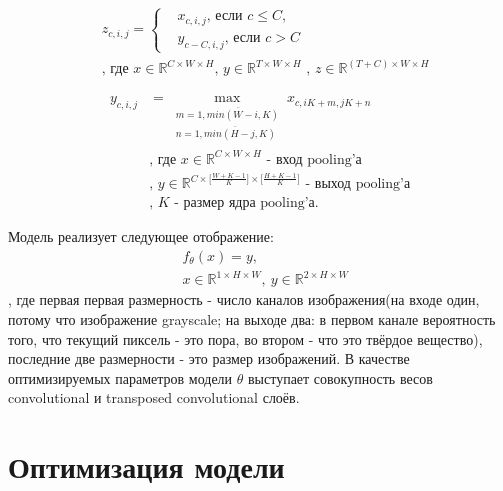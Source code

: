\documentclass[14pt, a4paper, oneside, bold]{extarticle}
\begin{document}
\begin{equation} \label{concat}
\begin{aligned}
	& z_{c, i, j} = \begin{cases}
		& x_{c, i, j} \text{, если $c \leq C$,} \\
		& y_{c - C, i, j} \text{, если $c > C$}
	\end{cases} \\
	& \text{, где $x \in \mathbb{R}^{C \times W \times H}$
	,\ $y \in \mathbb{R}^{T \times W \times H}$ 
	,\ $z \in \mathbb{R}^{(T + C) \times W \times H}$}
\end{aligned}
\end{equation}

\begin{equation} \label{pooling}
\begin{aligned}
	y_{c, i, j} & = \max \limits_{
		\substack{
			m=\overline{1, min(W - i, K)}
			\\ n=\overline{1, min(H - j, K)}}}
		x_{c, i K + m, j K + n} \\
	& \text{, где $x \in \mathbb{R}^{C \times W \times H}$ 
		- вход pooling'а} \\
	& \text{, $y \in \mathbb{R}
		^{C 
		  \times \bigl[ \frac{W + K - 1}{K} \bigr] 
		  \times \bigl[ \frac{H + K - 1}{K} \bigr] }$ 
		- выход pooling'а} \\
	& \text{, $K$ - размер ядра pooling'а}.
\end{aligned}
\end{equation}

Модель реализует следующее отображение: 
\begin{equation} \label{model}
\begin{aligned}
	& f_{\theta}(x) = y, \\
	& x \in \mathbb{R}^{1 \times H \times W}
		,\ y \in 
		\mathbb{R}^{2 \times H \times W}
\end{aligned}
\end{equation}
, где первая первая размерность - число каналов изображения(на входе один, потому что изображение grayscale; на выходе два: в первом канале вероятность того, что текущий пиксель - это пора, во втором - что это твёрдое вещество), последние две размерности - это размер изображений. В качестве оптимизируемых параметров модели $\theta$ выступает совокупность весов convolutional и transposed convolutional слоёв.

\newpage


\section{Оптимизация модели} \label{seg_optimization}
\end{document}
